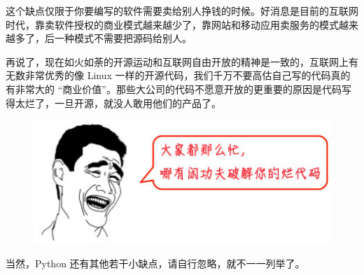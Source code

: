 这个缺点仅限于你要编写的软件需要卖给别人挣钱的时候。好消息是目前的互联网时代，靠卖软件授权的商业模式越来越少了，靠网站和移动应用卖服务的模式越来越多了，后一种模式不需要把源码给别人。

再说了，现在如火如荼的开源运动和互联网自由开放的精神是一致的，互联网上有无数非常优秀的像
Linux 一样的开源代码，我们千万不要高估自己写的代码真的有非常大的
``商业价值''。那些大公司的代码不愿意开放的更重要的原因是代码写得太烂了，一旦开源，就没人敢用他们的产品了。

 
 \begin{figure}[htp]
	\centering
	\includegraphics[width=0.6\linewidth]{fig/9230254446989120.png}
\end{figure}


当然，Python 还有其他若干小缺点，请自行忽略，就不一一列举了。

